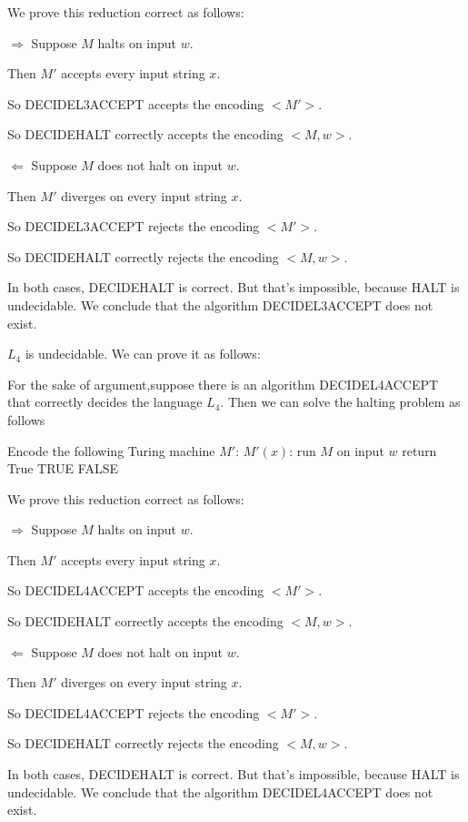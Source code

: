 \documentclass[12pt,a4paper]{article}
\newcommand{\question}[1]{\bigskip\noindent{\textbf{Q{#1} solution}}}
\begin{document}
We prove this reduction correct as follows:

$\Longrightarrow$ Suppose $M$ halts on input $w$.
     
	  Then $M'$ accepts every input string $x$.

	  So DECIDEL3ACCEPT accepts the encoding $<M'>$.

	  So DECIDEHALT correctly accepts the encoding $<M,w>$.


$\Longleftarrow$ Suppose $M$ does not halt on input $w$.

     Then $M'$ diverges on every input string $x$.

	 So DECIDEL3ACCEPT rejects the encoding $<M'>$.

	 So DECIDEHALT correctly rejects the encoding $<M,w>$.

In both cases, DECIDEHALT is correct. But that's impossible, because HALT is undecidable. We conclude that the algorithm DECIDEL3ACCEPT does not exist.

\question{37.E}

$L_4$ is undecidable. We can prove it as follows:

For the sake of argument,suppose there is an algorithm DECIDEL4ACCEPT that correctly decides the language $L_4$. Then we can solve the halting problem as follows
\begin{algorithm}
	\begin{algorithmic}
		\State Encode the following Turing machine $M'$:
		\State\quad $M'(x)$:
			\State\quad\quad run $M$ on input $w$
			\State\quad\quad return True
		\State \Return TRUE
		\Else{}
		\State \Return FALSE 
		\EndIf
		\EndFunction
	\end{algorithmic}
\end{algorithm}

We prove this reduction correct as follows:

$\Longrightarrow$ Suppose $M$ halts on input $w$.
     
	  Then $M'$ accepts every input string $x$.

	  So DECIDEL4ACCEPT accepts the encoding $<M'>$.

	  So DECIDEHALT correctly accepts the encoding $<M,w>$.


$\Longleftarrow$ Suppose $M$ does not halt on input $w$.

     Then $M'$ diverges on every input string $x$.

	 So DECIDEL4ACCEPT rejects the encoding $<M'>$.

	 So DECIDEHALT correctly rejects the encoding $<M,w>$.

In both cases, DECIDEHALT is correct. But that's impossible, because HALT is undecidable. We conclude that the algorithm DECIDEL4ACCEPT does not exist.
\end{document}
